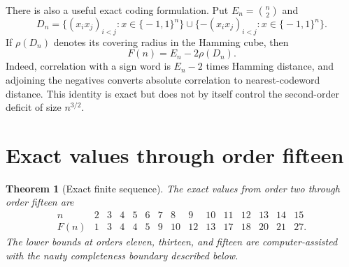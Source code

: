 \documentclass[11pt]{article}
\newcommand{\eps}{\{\!-1,1\!\}}
\newtheorem{theorem}{Theorem}[section]
\theoremstyle{remark}
\begin{document}
There is also a useful exact coding formulation.  Put $E_n=\binom n2$ and
\[
 D_n=\{(x_ix_j)_{i<j}:x\in\eps^n\}
      \cup\{-(x_ix_j)_{i<j}:x\in\eps^n\}.
\]
If $\rho(D_n)$ denotes its covering radius in the Hamming cube, then
\begin{equation}
 F(n)=E_n-2\rho(D_n).                                      \label{eq:cover}
\end{equation}
Indeed, correlation with a sign word is $E_n-2$ times Hamming distance, and
adjoining the negatives converts absolute correlation to nearest-codeword
distance.  This identity is exact but does not by itself control the
second-order deficit of size $n^{3/2}$.

\section{Exact values through order fifteen}

\begin{theorem}[Exact finite sequence]
The exact values from order two through order fifteen are
\[
\begin{array}{c|rrrrrrrrrrrrrr}
n&2&3&4&5&6&7&8&9&10&11&12&13&14&15\\ \hline
F(n)&1&3&4&4&5&9&10&12&13&17&18&20&21&27.
\end{array}
\]
The lower bounds at orders eleven, thirteen, and fifteen are
computer-assisted with the nauty completeness boundary described below.
\end{theorem}
\end{document}
